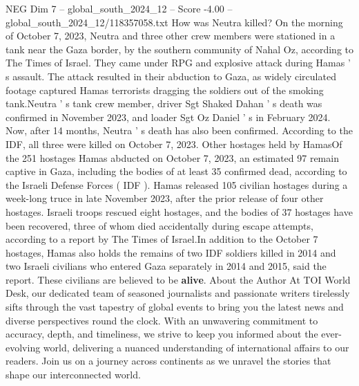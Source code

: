 \begin{textsample}{NEG Dim 7 – global\_south\_2024\_12 – Score -4.00 – global\_south\_2024\_12/118357058.txt}
How was Neutra killed?
On the morning of October 7, 2023, Neutra and three other crew members were stationed in a tank near the Gaza border, by the southern community of Nahal Oz, according to The Times of Israel.
They came under RPG and explosive attack during Hamas ' s assault.
The attack resulted in their abduction to Gaza, as widely circulated footage captured Hamas terrorists dragging the soldiers out of the smoking tank.Neutra ' s tank crew member, driver Sgt Shaked Dahan ' s death was confirmed in November 2023, and loader Sgt Oz Daniel ' s in February 2024.
Now, after 14 months, Neutra ' s death has also been confirmed.
According to the IDF, all three were killed on October 7, 2023.
Other hostages held by HamasOf the 251 hostages Hamas abducted on October 7, 2023, an estimated 97 remain captive in Gaza, including the bodies of at least 35 confirmed dead, according to the Israeli Defense Forces ( IDF ).
Hamas released 105 civilian hostages during a week-long truce in late November 2023, after the prior release of four other hostages.
Israeli troops rescued eight hostages, and the bodies of 37 hostages have been recovered, three of whom died accidentally during escape attempts, according to a report by The Times of Israel.In addition to the October 7 hostages, Hamas also holds the remains of two IDF soldiers killed in 2014 and two Israeli civilians who entered Gaza separately in 2014 and 2015, said the report.
These civilians are believed to be \textbf{alive}.
About the Author At TOI World Desk, our dedicated team of seasoned journalists and passionate writers tirelessly sifts through the vast tapestry of global events to bring you the latest news and diverse perspectives round the clock.
With an unwavering commitment to accuracy, depth, and timeliness, we strive to keep you informed about the ever-evolving world, delivering a nuanced understanding of international affairs to our readers.
Join us on a journey across continents as we unravel the stories that shape our interconnected world.

\end{textsample}
